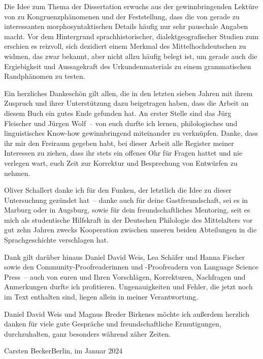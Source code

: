 Die Idee zum Thema der Dissertation erwuchs aus der gewinnbringenden Lektüre
von \citet{corbett2006} zu Kongruenz\-phänomenen und der Feststellung, dass die
 von \citet{paul2007} gerade zu interessanten
morpho\-syntaktischen Details häufig nur sehr pauschale Angaben macht. Vor dem
Hintergrund sprach\-historischer, dialekt\-geografischer Studien zum \CAO{}
\autocite{beckerschallert2021,beckerschallert2022a, beckerschallert2022b}
erschien es reizvoll, sich dezidiert einem Merkmal des Mittelhochdeutschen zu
widmen, das zwar bekannt, aber nicht allzu häufig belegt ist, um gerade auch
die Ergiebigkeit und Aussagekraft des Urkunden\-materials zu einem
grammatischen Randphänomen zu testen.

Ein herzliches Dankeschön gilt allen, die in den letzten sieben Jahren mit
ihrem Zuspruch und ihrer Unterstützung dazu beigetragen haben, dass die Arbeit
an diesem Buch ein gutes Ende gefunden hat. An erster Stelle sind das Jürg
Fleischer und Jürgen Wolf~-- von euch durfte ich lernen, philologisches und
linguistisches Know-how gewinnbringend miteinander zu verknüpfen. Danke, dass
ihr mir den Freiraum gegeben habt, bei dieser Arbeit alle Register meiner
Interessen zu ziehen, dass ihr stets ein offenes Ohr für Fragen hattet und nie
verlegen wart, euch Zeit zur Korrektur und Besprechung von Entwürfen zu nehmen.

Oliver Schallert danke ich für den Funken, der letztlich die Idee zu dieser
Untersuchung gezündet hat~-- danke auch für deine Gastfreundschaft, sei es in
Marburg oder in Augsburg, sowie für dein freundschaftliches Mentoring, seit es
mich als studentische Hilfskraft in der Deutschen Philologie des Mittelalters
vor gut zehn Jahren zwecks Kooperation zwischen unseren beiden Abteilungen in
die Sprachgeschichte verschlagen hat.

Dank gilt darüber hinaus Daniel David Weis, Lea Schäfer und Hanna Fischer sowie
den Community-Proofreaderinnen und -Proofreadern von Language Science Press~--
auch von euren und Ihren Vorschlägen, Korrekturen, Nachfragen und Anmerkungen
durfte ich profitieren. Ungenauigkeiten und Fehler, die jetzt noch im Text
enthalten sind, liegen allein in meiner Verantwortung.

\begin{sloppypar}
Daniel David Weis und Magnus Breder Birkenes möchte ich außerdem herzlich
danken für viele gute Gespräche und freundschaftliche Ermutigungen,
durchzuhalten, ganz besonders während zäher Zeiten.
\end{sloppypar}
\bigskip

\noindent%
Carsten Becker\hfill Berlin, im Januar 2024

